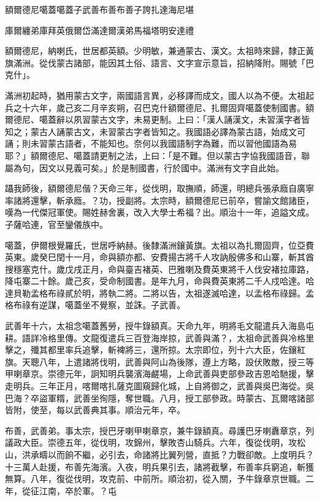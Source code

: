 
\begin{pinyinscope}
額爾德尼噶蓋噶蓋子武善布善布善子誇扎達海尼堪

庫爾纏弟庫拜英俄爾岱滿達爾漢弟馬福塔明安達禮

額爾德尼，納喇氏，世居都英額。少明敏，兼通蒙古、漢文。太祖時來歸，隸正黃旗滿洲。從伐蒙古諸部，能因其土俗、語言、文字宣示意旨，招納降附。賜號「巴克什」。

滿洲初起時，猶用蒙古文字，兩國語言異，必移譯而成文，國人以為不便。太祖起兵之十六年，歲己亥二月辛亥朔，召巴克什額爾德尼、扎爾固齊噶蓋使制國書。額爾德尼、噶蓋辭以夙習蒙古文字，未易更制。上曰：「漢人誦漢文，未習漢字者皆知之；蒙古人誦蒙古文，未習蒙古字者皆知之。我國語必譯為蒙古語，始成文可誦；則未習蒙古語者，不能知也。奈何以我國語制字為難，而以習他國語為易耶？」額爾德尼、噶蓋請更制之法，上曰：「是不難。但以蒙古字協我國語音，聯屬為句，因文以見義可矣。」於是制國書，行於國中。滿洲有文字自此始。

躡我師後，額爾德尼偕？天命三年，從伐明，取撫順，師還，明總兵張承廕自廣寧率諸將還擊，斬承廕。？功，授副將。太宗時，額爾德尼已前卒，嘗諭文館諸臣，嘆為一代傑冠軍使。賜姓赫舍裏，改入大學士希福？出。順治十一年，追謚文成。子薩哈連，官至鑾儀族中。

噶蓋，伊爾根覺羅氏，世居呼納赫。後隸滿洲鑲黃旗。太祖以為扎爾固齊，位亞費英東。歲癸巳閏十一月，命與額亦都、安費揚古將千人攻訥殷佛多和山寨，斬其酋搜穩塞克什。歲戊戌正月，命與臺吉褚英、巴雅喇及費英東將千人伐安褚拉庫路，降屯寨二十餘。歲己亥，受命制國書。是年九月，命與費英東將二千人戍哈達。哈達貝勒孟格布祿貳於明，將執二將。二將以告，太祖遂滅哈達，以孟格布祿歸。孟格布祿有逆謀，噶蓋坐不覺察，並誅。子武善。

武善年十六，太祖念噶蓋舊勞，授牛錄額真。天命九年，明將毛文龍遣兵入海島屯耕。語詳冷格里傳。文龍復遣兵三百登海岸掠，武善與滿？，太祖命武善與冷格里擊之，殲其都里率兵追擊，斬裨將三，還所掠。太宗即位，列十六大臣，佐鑲紅旗。天聰八年，上遣諸將伐明，武善與阿山為後隊，遵上方略，設伏敗敵，授三等甲喇章京。崇德元年，詗知明兵襲濱海鹺場，上命武善與吏部參政吉恩哈馳援，擊走明兵。三年正月，喀爾喀扎薩克圖窺歸化城，上自將御之，武善與吳巴海從。吳巴海？卒盜軍糈，武善坐徇隱，奪世職。八月，授工部參政。時蒙古、瓦爾喀諸部皆附，使至，每以武善典其事。順治元年，卒。

布善，武善弟。事太宗，授巴牙喇甲喇章京，兼牛錄額真。尋護巴牙喇纛章京，列議政大臣。崇德五年，從伐明，攻錦州，擊敗杏山騎兵。六年，復從伐明，攻松山，洪承疇以而餉不繼，必引去，命諸將比翼列營，直抵？力戰卻敵。上度明兵？十三萬人赴援，布善先海濱。入夜，明兵果引去，諸將截擊，布善率兵窮追，斬獲無算。八年，復從伐明，攻克前、中前所。順治初，從入關，予牛錄章京世職。二年，從征江南，卒於軍。？屯


\end{pinyinscope}
